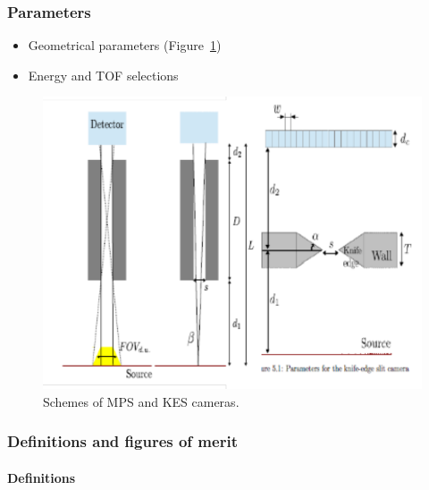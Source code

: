\documentclass[a4paper,english]{article}
\begin{document}
\subsubsection{Parameters}

\begin{itemize}
  \item Geometrical parameters (Figure~\ref{GeomSchemes})
  \item Energy and TOF selections
\end{itemize}

\begin{figure}[htp]
    \centering
    \includegraphics[width=.45\textwidth]{SchemeMPS-KES}
    \caption{\label{GeomSchemes}Schemes of MPS and KES cameras.}
\end{figure}          

\subsubsection{Definitions and figures of merit}



\paragraph{Definitions}
\end{document}
